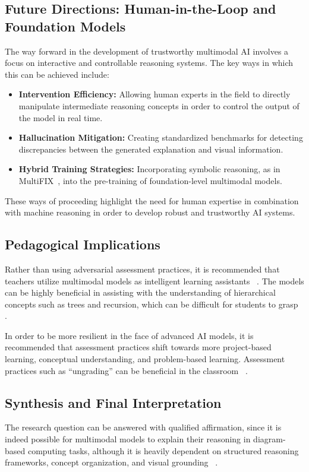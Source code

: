 \documentclass[sigconf, nonacm]{acmart}
\begin{document}
\subsection{Future Directions: Human-in-the-Loop and Foundation Models}
The way forward in the development of trustworthy multimodal AI involves 
a focus on interactive and controllable reasoning systems.
The key ways in which this can be achieved include:
\begin{itemize}
    \item \textbf{Intervention Efficiency:} Allowing human experts in the field 
    to directly manipulate intermediate reasoning concepts in order to control 
    the output of the model in real time.
    \item \textbf{Hallucination Mitigation:} Creating standardized benchmarks 
    for detecting discrepancies between the generated explanation and visual 
    information.
    \item \textbf{Hybrid Training Strategies:} Incorporating symbolic reasoning, 
    as in MultiFIX~\cite{malafaia2025step}, into the pre-training of foundation-level multimodal models.
\end{itemize}
These ways of proceeding highlight the need for human expertise in combination 
with machine reasoning in order to develop robust and trustworthy AI systems.

\subsection{Pedagogical Implications}
Rather than using adversarial assessment practices, it is recommended that 
teachers utilize multimodal models as intelligent learning assistants~%
\cite{denny2023conversing, gutierrez2024seeing}. The models can be highly 
beneficial in assisting with the understanding of hierarchical concepts 
such as trees and recursion, which can be difficult for students to grasp~%
\cite{gutierrez2024seeing, hou2024more}.

In order to be more resilient in the face of advanced AI models, it is 
recommended that assessment practices shift towards more project-based 
learning, conceptual understanding, and problem-based learning. Assessment 
practices such as ``ungrading'' can be beneficial in the classroom~%
\cite{gutierrez2024seeing, hou2024more}.

\subsection{Synthesis and Final Interpretation}
The research question can be answered with qualified affirmation, since it 
is indeed possible for multimodal models to explain their reasoning in 
diagram-based computing tasks, although it is heavily dependent on structured 
reasoning frameworks, concept organization, and visual grounding~%
\cite{chen2024m3cot, jiang2025wise}.
\end{document}
